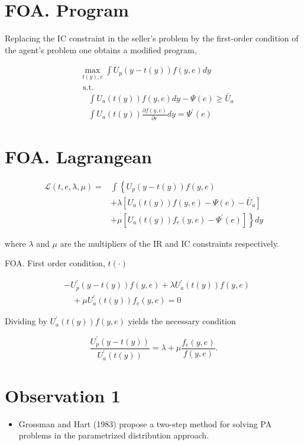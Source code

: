 \documentclass[10pt]{article}
\begin{document}
\section*{FOA. Program}
Replacing the IC constraint in the seller's problem by the first-order condition of the agent's problem one obtains a modified program,

$$
\begin{aligned}
& \max _{t(y), e} \int U_{p}(y-t(y)) f(y, e) d y \\
& \text { s.t. } \\
& \quad \int U_{a}(t(y)) f(y, e) d y-\Psi(e) \geq \bar{U}_{a} \\
& \quad \int U_{a}(t(y)) \frac{\partial f(y, e)}{\partial e} d y=\Psi^{\prime}(e)
\end{aligned}
$$

\section*{FOA. Lagrangean}
$$
\begin{aligned}
\mathcal{L}(t, e, \lambda, \mu)= & \int\left\{U_{p}(y-t(y)) f(y, e)\right. \\
& +\lambda\left[U_{a}(t(y)) f(y, e)-\Psi(e)-\bar{U}_{a}\right] \\
& \left.+\mu\left[U_{a}(t(y)) f_{e}(y, e)-\Psi^{\prime}(e)\right]\right\} d y
\end{aligned}
$$

where $\lambda$ and $\mu$ are the multipliers of the IR and IC constraints respectively.

FOA. First order condition, $t(\cdot)$

$$
\begin{aligned}
& -U_{p}^{\prime}(y-t(y)) f(y, e)+\lambda U_{a}^{\prime}(t(y)) f(y, e) \\
& \quad+\mu U_{a}^{\prime}(t(y)) f_{e}(y, e)=0
\end{aligned}
$$

Dividing by $U_{a}^{\prime}(t(y)) f(y, e)$ yields the necessary condition


\begin{equation*}
\frac{U_{p}^{\prime}(y-t(y))}{U_{a}^{\prime}(t(y))}=\lambda+\mu \frac{f_{e}(y, e)}{f(y, e)} . \tag{5}
\end{equation*}


\section*{Observation 1}
\begin{itemize}
  \item Grossman and Hart (1983) propose a two-step method for solving PA problems in the parametrized distribution approach.
\end{itemize}
\end{document}
